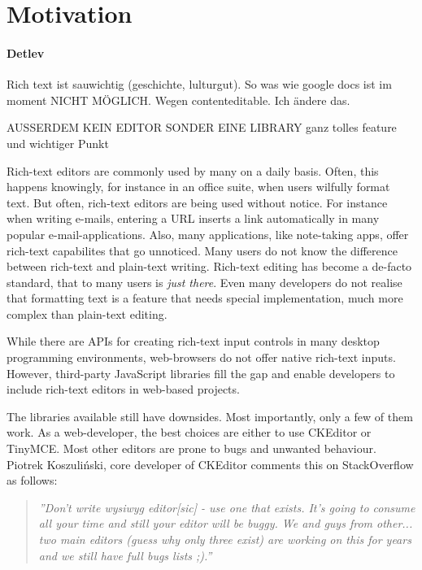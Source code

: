 \section{Motivation}

\paragraph{Detlev} Rich text ist sauwichtig (geschichte, lulturgut). So was wie google docs ist im moment NICHT MÖGLICH. Wegen contenteditable. Ich ändere das.

AUSSERDEM KEIN EDITOR SONDER EINE LIBRARY ganz tolles feature und wichtiger Punkt


Rich-text editors are commonly used by many on a daily basis. Often, this happens knowingly, for instance in an office suite, when users wilfully format text. But often, rich-text editors are being used without notice. For instance when writing e-mails, entering a URL inserts a link automatically in many popular e-mail-applications. Also, many applications, like note-taking apps, offer rich-text capabilites that go unnoticed. Many users do not know the difference between rich-text and plain-text writing. Rich-text editing has become a de-facto standard, that to many users is \textit{just there}. Even many developers do not realise that formatting text is a feature that needs special implementation, much more complex than plain-text editing.

While there are APIs for creating rich-text input controls in many desktop programming environments, web-browsers do not offer native rich-text inputs. However, third-party JavaScript libraries fill the gap and enable developers to include rich-text editors in web-based projects.

The libraries available still have downsides. Most importantly, only a few of them work. As a web-developer, the best choices are either to use CKEditor or TinyMCE. Most other editors are prone to bugs and unwanted behaviour. Piotrek Koszuli\'{n}ski, core developer of CKEditor comments this on StackOverflow as follows:

\begin{quotation}
\textit{''Don't write wysiwyg editor[sic] - use one that exists. It's going to consume all your time and still your editor will be buggy. We and guys from other... two main editors (guess why only three exist) are working on this for years and we still have full bugs lists ;).\cite{sopp}''}
\end{quotation} %

